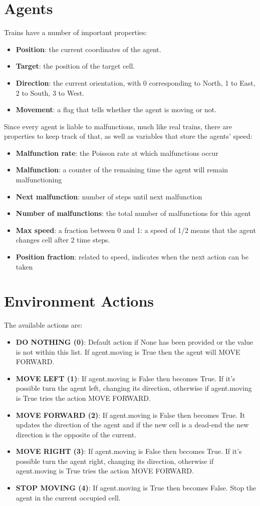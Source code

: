 \section{Agents}
Trains have a number of important properties:
\begin{itemize}
\item \textbf{Position}: the current coordinates of the agent.
\item \textbf{Target}: the position of the target cell.
\item \textbf{Direction}: the current orientation, with 0 corresponding to North, 1 to East, 2 to South, 3 to West. 
\item \textbf{Movement}: a flag that tells whether the agent is moving or not.
\end{itemize}
\noindent
Since every agent is liable to malfunctions, much like real trains, there are properties to keep track of that, as well as variables that store the agents' speed:
\begin{itemize}
\item 	\textbf{Malfunction rate}: the Poisson rate at which malfunctions occur
\item \textbf{Malfunction}: a counter of the remaining time the agent will remain malfunctioning
\item \textbf{Next malfunction}: number of steps until next malfunction
\item \textbf{Number of malfunctions}: the total number of malfunctions for this agent
\item \textbf{Max speed}: a fraction between 0 and 1: a speed of 1/2 means that the agent changes cell after 2 time steps.
\item \textbf{Position fraction}: related to speed, indicates when the next action can be taken
\end{itemize}
\section{Environment Actions}
\label{sec:envActions}
The available actions are:
\begin{itemize}
\item \textbf{DO NOTHING (0)}: Default action if None has been provided or the value is not within this list. If agent.moving is True then the agent will MOVE FORWARD.
\item \textbf{MOVE LEFT (1)}: If agent.moving is False then becomes True. If it’s possible turn the agent left, changing its direction, otherwise if agent.moving is True tries the action MOVE FORWARD.
\item \textbf{MOVE FORWARD (2)}: If agent.moving is False then becomes True. It updates the direction of the agent and if the new cell is a dead-end the new direction is the opposite of the current.

\item \textbf{MOVE RIGHT (3)}: If agent.moving is False then becomes True. If it’s possible turn the agent right, changing its direction, otherwise if agent.moving is True tries the action MOVE FORWARD.
\item \textbf{STOP MOVING (4)}: If agent.moving is True then becomes False. Stop the agent in the current occupied cell.
\end{itemize}

